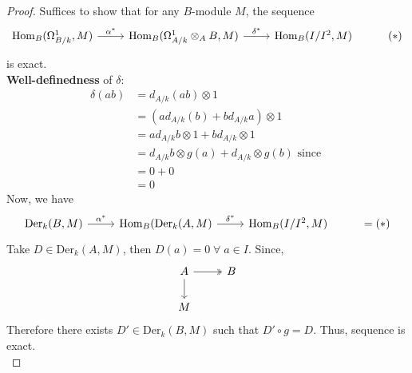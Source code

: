 \documentclass[oneside, 12pt]{scrbook}
\newcommand{\Hom}{\mathrm{Hom}}
\theoremstyle{theorem}
\begin{document}
\begin{proof}
Suffices to show that for any $B$-module $M$, the sequence 
\[\begin{tikzcd}
	{\Hom_{B}(\Omega_{B/k}^{1},M)} & {\Hom_{B}(\Omega_{A/k}^{1} \otimes_{A} B,M)} & {\Hom_{B}(I/I^2,M)} & {(*)}
	\arrow["\delta^*", from=1-2, to=1-3]
	\arrow["\alpha^*", from=1-1, to=1-2]
\end{tikzcd}\] is exact. \\
\textbf{Well-definedness} of $\delta$: 
\begin{align*}
\delta(ab) &= d_{A/k}(ab) \otimes 1 \\
&=(ad_{A/k}(b) + bd_{A/k}a) \otimes 1 \\
&= ad_{A/k}b \otimes 1 + bd_{A/k} \otimes 1 \\
&= d_{A/k}b \otimes g(a) + d_{A/k} \otimes g(b) \text{ since }\\
&= 0+0 \\
&= 0
\end{align*}
Now, we have 
\[\begin{tikzcd}
	{\mathrm{Der}_{k}(B,M)} & {\Hom_{B}( \mathrm{Der}_{k}(A,M)} & {\Hom_{B}(I/I^2,M)} & {=(*)}
	\arrow["\delta^*", from=1-2, to=1-3]
	\arrow["\alpha^*", from=1-1, to=1-2]
\end{tikzcd}\]
Take $D\in \mathrm{Der}_{k}(A,M)$, then $D(a)=0 \; \forall \; a \in I$. Since, 
\[\begin{tikzcd}
	A & B \\
	M
	\arrow[two heads, from=1-1, to=1-2]
	\arrow[from=1-1, to=2-1]
\end{tikzcd}\]
Therefore there exists $D' \in \mathrm{Der}_{k}(B,M)$ such that $D' \circ g = D$. Thus, sequence is exact. \\


\end{proof}
\end{document}
